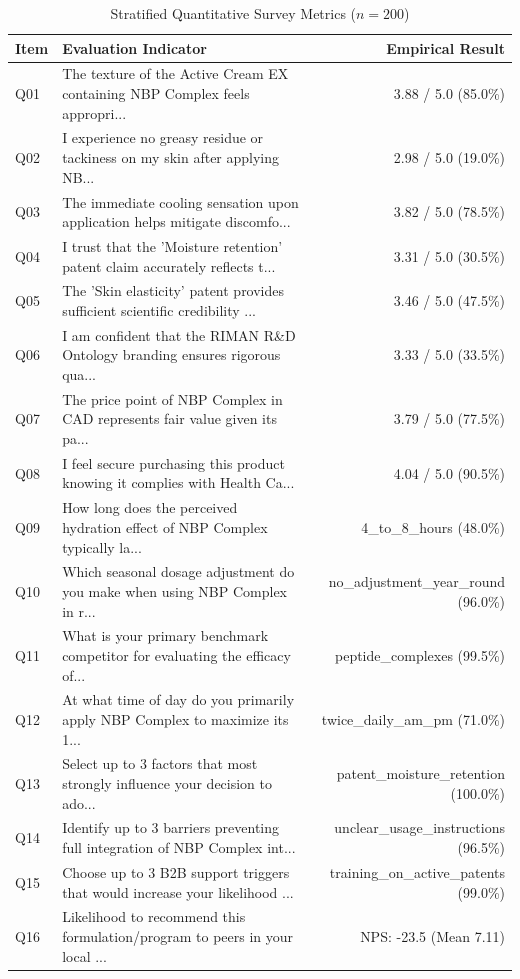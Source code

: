 \documentclass[10pt,twocolumn,a4paper]{article}
\begin{document}
\begin{table}[t]
\centering
\caption{Stratified Quantitative Survey Metrics ($n = 200$)}
\label{tab:metrics}
\small
\begin{tabularx}{\textwidth}{l X r}
\toprule
\textbf{Item} & \textbf{Evaluation Indicator} & \textbf{Empirical Result} \\
\midrule
Q01 & The texture of the Active Cream EX containing NBP Complex feels appropri... & 3.88 / 5.0 (85.0\%) \\
Q02 & I experience no greasy residue or tackiness on my skin after applying NB... & 2.98 / 5.0 (19.0\%) \\
Q03 & The immediate cooling sensation upon application helps mitigate discomfo... & 3.82 / 5.0 (78.5\%) \\
Q04 & I trust that the 'Moisture retention' patent claim accurately reflects t... & 3.31 / 5.0 (30.5\%) \\
Q05 & The 'Skin elasticity' patent provides sufficient scientific credibility ... & 3.46 / 5.0 (47.5\%) \\
Q06 & I am confident that the RIMAN R\&D Ontology branding ensures rigorous qua... & 3.33 / 5.0 (33.5\%) \\
Q07 & The price point of NBP Complex in CAD represents fair value given its pa... & 3.79 / 5.0 (77.5\%) \\
Q08 & I feel secure purchasing this product knowing it complies with Health Ca... & 4.04 / 5.0 (90.5\%) \\
Q09 & How long does the perceived hydration effect of NBP Complex typically la... & 4\_to\_8\_hours (48.0\%) \\
Q10 & Which seasonal dosage adjustment do you make when using NBP Complex in r... & no\_adjustment\_year\_round (96.0\%) \\
Q11 & What is your primary benchmark competitor for evaluating the efficacy of... & peptide\_complexes (99.5\%) \\
Q12 & At what time of day do you primarily apply NBP Complex to maximize its 1... & twice\_daily\_am\_pm (71.0\%) \\
Q13 & Select up to 3 factors that most strongly influence your decision to ado... & patent\_moisture\_retention (100.0\%) \\
Q14 & Identify up to 3 barriers preventing full integration of NBP Complex int... & unclear\_usage\_instructions (96.5\%) \\
Q15 & Choose up to 3 B2B support triggers that would increase your likelihood ... & training\_on\_active\_patents (99.0\%) \\
Q16 & Likelihood to recommend this formulation/program to peers in your local ... & NPS: -23.5 (Mean 7.11) \\
\bottomrule
\end{tabularx}
\end{table}
\end{document}
